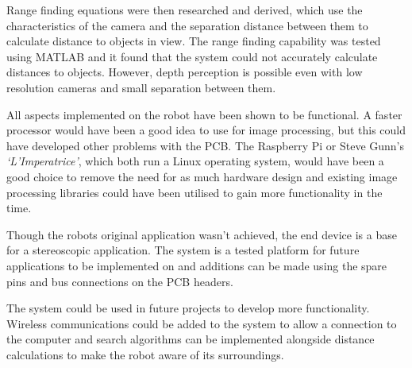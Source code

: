 Range finding equations were then researched and derived, which use the characteristics of the camera and the separation distance between them to calculate distance to objects in view. The range finding capability was tested using MATLAB and it found that the system could not accurately calculate distances to objects. However, depth perception is possible even with low resolution cameras and small separation between them.

All aspects implemented on the robot have been shown to be functional. A faster processor would have been a good idea to use for image processing, but this could have developed other problems with the PCB. The Raspberry Pi or Steve Gunn's \textit{`L'Imperatrice'}, which both run a Linux operating system, would have been a good choice to remove the need for as much hardware design and existing image processing libraries could have been utilised to gain more functionality in the time. 

Though the robots original application wasn't achieved, the end device is a base for a stereoscopic application. The system is a tested platform for future applications to be implemented on and additions can be made using the spare pins and bus connections on the PCB headers. 

The system could be used in future projects to develop more functionality. Wireless communications could be added to the system to allow a connection to the computer and search algorithms can be implemented alongside distance calculations to make the robot aware of its surroundings. 
